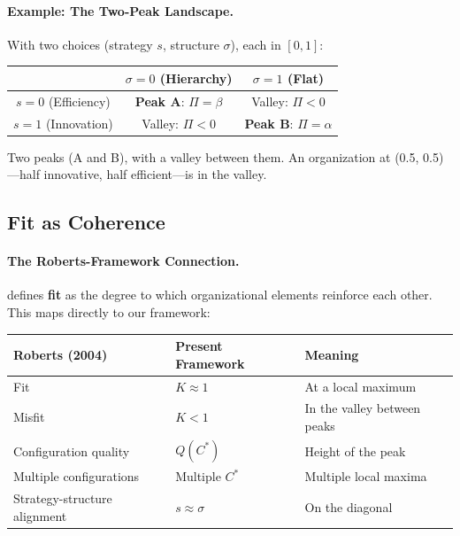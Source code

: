 \paragraph{Example: The Two-Peak Landscape.}
With two choices (strategy $s$, structure $\sigma$), each in $[0,1]$:

\begin{center}
\begin{tabular}{ccc}
& $\sigma = 0$ (Hierarchy) & $\sigma = 1$ (Flat) \\
\hline
$s = 0$ (Efficiency) & \textbf{Peak A}: $\Pi = \beta$ & Valley: $\Pi < 0$ \\
$s = 1$ (Innovation) & Valley: $\Pi < 0$ & \textbf{Peak B}: $\Pi = \alpha$ \\
\end{tabular}
\end{center}

Two peaks (A and B), with a valley between them.
An organization at (0.5, 0.5)---half innovative, half efficient---is in the valley.

\subsection{Fit as Coherence}

\paragraph{The Roberts-Framework Connection.}
\citet{roberts2004} defines \textbf{fit} as the degree to which
organizational elements reinforce each other.
This maps directly to our framework:

\begin{center}
\renewcommand{\arraystretch}{1.3}
\begin{tabular}{lll}
\hline
\textbf{Roberts (2004)} & \textbf{Present Framework} & \textbf{Meaning} \\
\hline
Fit & $K \approx 1$ & At a local maximum \\
Misfit & $K < 1$ & In the valley between peaks \\
Configuration quality & $Q(C^*)$ & Height of the peak \\
Multiple configurations & Multiple $C^*$ & Multiple local maxima \\
Strategy-structure alignment & $s \approx \sigma$ & On the diagonal \\
\hline
\end{tabular}
\end{center}

